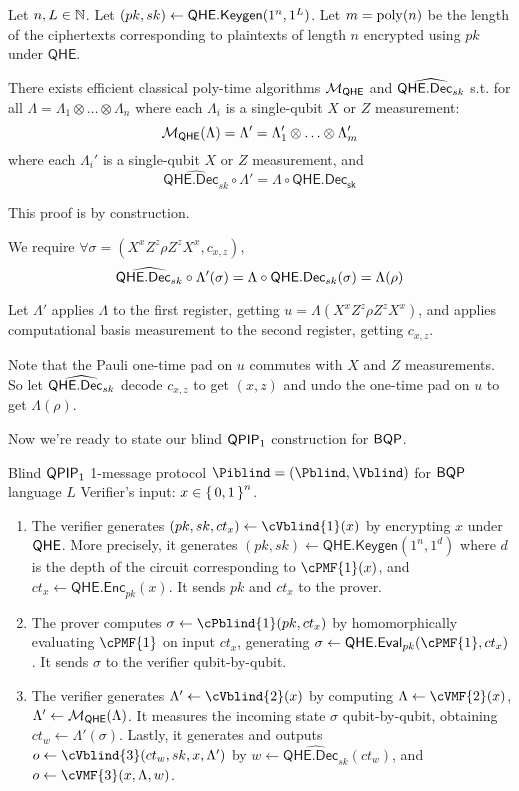 \begin{thm}
	\label{decodeMeasureOrder}
	Let $n, L\in\mathbb{N}$.
	Let $(pk, sk)\leftarrow\mathsf{QHE.Keygen}(1^n, 1^L)$.
	Let $m=\operatorname*{\operatorname{poly}}(n)$ be the length of the ciphertexts corresponding to plaintexts of length $n$ encrypted using $pk$ under $\mathsf{QHE}$.
	
	There exists efficient classical poly-time algorithms ${\cal M}_{\mathsf{QHE}}$ and $\widehat{\mathsf{QHE.Dec}_{sk}}$ s.t.
	for all $\Lambda=\Lambda_1\otimes\ldots\otimes\Lambda_n$ where each $\Lambda_i$ is a single-qubit $X$ or $Z$ measurement:
	$${\cal M}_{\mathsf{QHE}}(\Lambda)=\Lambda'=\Lambda'_1\otimes\ldots\otimes\Lambda'_m$$
	where each $\Lambda_i'$ is a single-qubit $X$ or $Z$ measurement, and
	$$\widehat{\mathsf{QHE.Dec}_{sk}}\circ\Lambda'=\Lambda\circ\mathsf{QHE.Dec_{sk}}$$
\end{thm}
\begin{prf}
	This proof is by construction.

	We require $\forall\sigma=(X^xZ^z\rho Z^zX^x, c_{x,z})$,
	$$\widehat{\mathsf{QHE.Dec}_{sk}}\circ\Lambda'(\sigma)=\Lambda\circ\mathsf{QHE.Dec}_{sk}(\sigma)=\Lambda(\rho)$$
	
	Let $\Lambda'$ applies $\Lambda$ to the first register, getting $u=\Lambda(X^xZ^z\rho Z^zX^x)$, and applies computational basis measurement to the second register, getting $c_{x, z}$.

	Note that the Pauli one-time pad on $u$ commutes with $X$ and $Z$ measurements.
	So let $\widehat{\mathsf{QHE.Dec}_{sk}}$ decode $c_{x, z}$ to get $(x, z)$ and undo the one-time pad on $u$ to get $\Lambda(\rho)$.
\end{prf}

Now we're ready to state our blind $\operatorname{\mathsf{QPIP}}_1$ construction for $\operatorname{\mathsf{BQP}}$.

\begin{protocol}{Blind $\operatorname{\mathsf{QPIP}}_1$ 1-message protocol $\Piblind = (\Pblind, \Vblind)$ for $\operatorname{\mathsf{BQP}}$ language $L$}
	\label{proto:BlindBQP}
	Verifier's input: $x\in\set{0,1}^n$.
	
	\begin{enumerate}
		\item The verifier generates $(pk, sk, ct_x)\leftarrow\cVblind{1}(x)$ by encrypting $x$ under $\mathsf{QHE}$.
			More precisely, it generates
			$(pk, sk)\leftarrow\mathsf{QHE.Keygen}(1^n, 1^d)$ where $d$ is the depth of the circuit corresponding to $\cPMF{1}(x)$, and
			$ct_x\leftarrow\mathsf{QHE.Enc}_{pk}(x)$.
			It sends $pk$ and $ct_x$ to the prover.
		\item The prover computes $\sigma\leftarrow\cPblind{1}(pk, ct_x)$ by homomorphically evaluating $\cPMF{1}$ on input $ct_x$, generating $\sigma\leftarrow\QEval_{pk}(\cPMF{1}, ct_x)$.
			It sends $\sigma$ to the verifier qubit-by-qubit.
		\item The verifier generates $\Lambda'\leftarrow\cVblind{2}(x)$ by computing
			$\Lambda\leftarrow\cVMF{2}(x)$,
			$\Lambda'\leftarrow{\cal M}_{\mathsf{QHE}}(\Lambda)$.
			It measures the incoming state $\sigma$ qubit-by-qubit, obtaining $ct_w\leftarrow\Lambda'(\sigma)$.
			Lastly, it generates and outputs $o\leftarrow\cVblind{3}(ct_w, sk, x, \Lambda')$ by
			$w\leftarrow\widehat{\mathsf{QHE.Dec}_{sk}}(ct_w)$,
			and $o\leftarrow\cVMF{3}(x, \Lambda, w)$.
	\end{enumerate}
\end{protocol}

